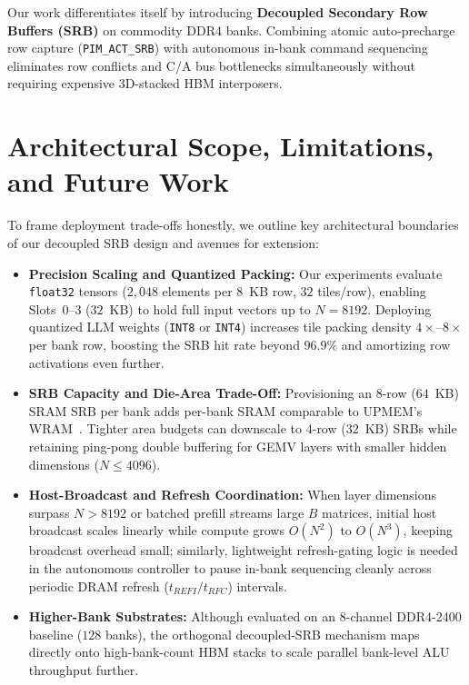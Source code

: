 \documentclass[conference]{IEEEtran}
\begin{document}
Our work differentiates itself by introducing \textbf{Decoupled Secondary Row Buffers (SRB)} on commodity DDR4 banks. Combining atomic auto-precharge row capture (\texttt{PIM\_ACT\_SRB}) with autonomous in-bank command sequencing eliminates row conflicts and C/A bus bottlenecks simultaneously without requiring expensive 3D-stacked HBM interposers.

\section{Architectural Scope, Limitations, and Future Work}
\label{sec:scope}
To frame deployment trade-offs honestly, we outline key architectural boundaries of our decoupled SRB design and avenues for extension:
\begin{itemize}
    \item \textbf{Precision Scaling and Quantized Packing:} Our experiments evaluate \texttt{float32} tensors ($2,048$ elements per 8~KB row, $32$ tiles/row), enabling Slots~0--3 ($32$~KB) to hold full input vectors up to $N = 8192$. Deploying quantized LLM weights (\texttt{INT8} or \texttt{INT4}) increases tile packing density $4\times\text{--}8\times$ per bank row, boosting the SRB hit rate beyond $96.9\%$ and amortizing row activations even further.
    \item \textbf{SRB Capacity and Die-Area Trade-Off:} Provisioning an 8-row ($64$~KB) SRAM SRB per bank adds per-bank SRAM comparable to UPMEM's WRAM~\cite{devaux2019true}. Tighter area budgets can downscale to 4-row ($32$~KB) SRBs while retaining ping-pong double buffering for GEMV layers with smaller hidden dimensions ($N \le 4096$).
    \item \textbf{Host-Broadcast and Refresh Coordination:} When layer dimensions surpass $N > 8192$ or batched prefill streams large $B$ matrices, initial host broadcast scales linearly while compute grows $O(N^2)$ to $O(N^3)$, keeping broadcast overhead small; similarly, lightweight refresh-gating logic is needed in the autonomous controller to pause in-bank sequencing cleanly across periodic DRAM refresh ($t_{REFI}/t_{RFC}$) intervals.
    \item \textbf{Higher-Bank Substrates:} Although evaluated on an 8-channel DDR4-2400 baseline ($128$ banks), the orthogonal decoupled-SRB mechanism maps directly onto high-bank-count HBM stacks to scale parallel bank-level ALU throughput further.
\end{itemize}
\end{document}
